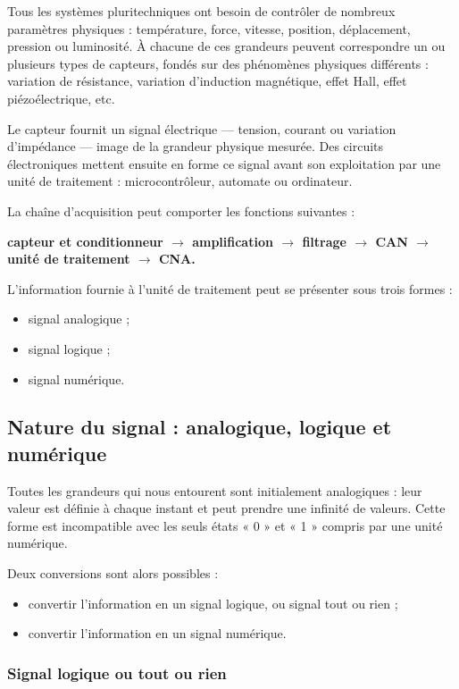 Tous les systèmes pluritechniques ont besoin de contrôler de nombreux paramètres physiques : température, force, vitesse, position, déplacement, pression ou luminosité. À chacune de ces grandeurs peuvent correspondre un ou plusieurs types de capteurs, fondés sur des phénomènes physiques différents : variation de résistance, variation d'induction magnétique, effet Hall, effet piézoélectrique, etc.

Le capteur fournit un signal électrique — tension, courant ou variation d'impédance — image de la grandeur physique mesurée. Des circuits électroniques mettent ensuite en forme ce signal avant son exploitation par une unité de traitement : microcontrôleur, automate ou ordinateur.

\TLChaineAcquisition

La chaîne d'acquisition peut comporter les fonctions suivantes :
\begin{center}
\textbf{capteur et conditionneur $\rightarrow$ amplification $\rightarrow$ filtrage $\rightarrow$ CAN $\rightarrow$ unité de traitement $\rightarrow$ CNA.}
\end{center}

L'information fournie à l'unité de traitement peut se présenter sous trois formes :
\begin{itemize}
  \item signal analogique ;
  \item signal logique ;
  \item signal numérique.
\end{itemize}

\subsection{Nature du signal : analogique, logique et numérique}

Toutes les grandeurs qui nous entourent sont initialement analogiques : leur valeur est définie à chaque instant et peut prendre une infinité de valeurs. Cette forme est incompatible avec les seuls états « 0 » et « 1 » compris par une unité numérique.

Deux conversions sont alors possibles :
\begin{itemize}
  \item convertir l'information en un signal logique, ou signal tout ou rien ;
  \item convertir l'information en un signal numérique.
\end{itemize}

\subsubsection{Signal logique ou tout ou rien}

